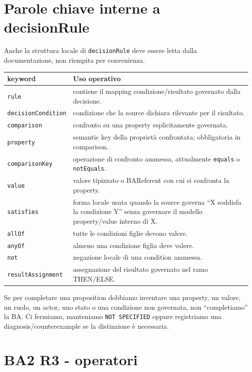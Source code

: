 \documentclass[11pt,a4paper]{article}
\newcommand{\code}[1]{\nolinkurl{#1}}
\begin{document}
\section{Parole chiave interne a decisionRule}

Anche la struttura locale di \code{decisionRule} deve essere letta dalla documentazione, non riempita per convenienza.

\begin{longtable}{L{0.26\textwidth}L{0.62\textwidth}}
\toprule
\textbf{keyword} & \textbf{Uso operativo} \\
\midrule\endhead
\code{rule} & contiene il mapping condizione/risultato governato dalla decisione. \\
\code{decisionCondition} & condizione che la source dichiara rilevante per il risultato. \\
\code{comparison} & confronto su una property esplicitamente governata. \\
\code{property} & semantic key della proprietà confrontata; obbligatoria in comparison. \\
\code{comparisonKey} & operazione di confronto ammessa, attualmente \code{equals} o \code{notEquals}. \\
\code{value} & valore tipizzato o BAReferent con cui si confronta la property. \\
\code{satisfies} & forma locale usata quando la source governa ``X soddisfa la condizione Y'' senza governare il modello property/value interno di X. \\
\code{allOf} & tutte le condizioni figlie devono valere. \\
\code{anyOf} & almeno una condizione figlia deve valere. \\
\code{not} & negazione locale di una condition ammessa. \\
\code{resultAssignment} & assegnazione del risultato governato nel ramo THEN/ELSE. \\
\bottomrule
\end{longtable}

\begin{closedbox}
Se per completare una proposition dobbiamo inventare una property, un valore, un ruolo, un actor, uno stato o una condizione non governata, non ``completiamo'' la BA. Ci fermiamo, manteniamo \code{NOT SPECIFIED} oppure registriamo una diagnosis/counterexample se la distinzione è necessaria.
\end{closedbox}

\section{BA2 R3 - operatori}
\end{document}
